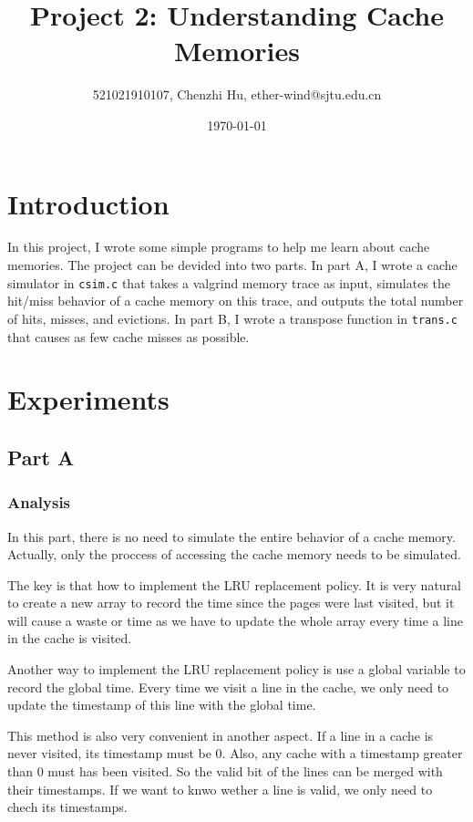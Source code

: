 \documentclass{article}
\title{\textbf{Project 2:  Understanding Cache Memories}} %
\author{521021910107, Chenzhi Hu, ether-wind@sjtu.edu.cn } %
\date{\today} %
\begin{document}
\maketitle %

\section{Introduction}

In this project, I wrote some simple programs to help me learn about cache memories. The project can be devided into two parts. In part A, I wrote a cache simulator in \verb|csim.c| that takes a valgrind memory trace as input, simulates the hit/miss behavior of a cache memory on this trace, and outputs the total number of hits, misses, and evictions. In part B, I wrote a transpose function in \verb|trans.c| that causes as few cache misses as possible.

\section{Experiments}

\subsection{Part A}

\subsubsection{Analysis}

In this part, there is no need to simulate the entire behavior of a cache memory. Actually, only the proccess of accessing the cache memory needs to be simulated. 

The key is that how to implement the LRU replacement policy. It is very natural to create a new array to record the time since the pages were last visited, but it will cause a waste or time as we have to update the whole array every time a line in the cache is visited.

Another way to implement the LRU replacement policy is use a global variable to record the global time. Every time we visit a line in the cache, we only need to update the timestamp of this line with the global time. 

This method is also very convenient in another aspect. If a line in a cache is never visited, its timestamp must be 0. Also, any cache with a timestamp greater than 0 must has been visited. So the valid bit of the lines can be merged with their timestamps. If we want to knwo wether a line is valid, we only need to chech its timestamps.
\end{document}
